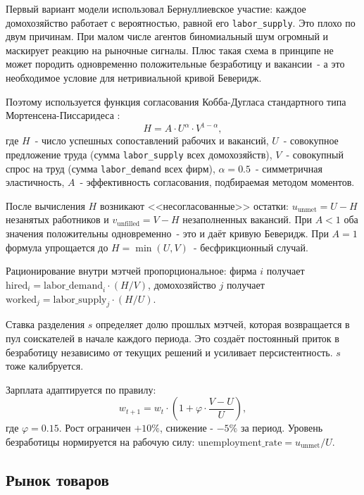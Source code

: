 \documentclass[12pt, a4paper]{article}
\begin{document}
Первый вариант модели использовал Бернуллиевское участие: каждое домохозяйство работает с вероятностью, равной его \texttt{labor\_supply}. Это плохо по двум причинам. При малом числе агентов биномиальный шум огромный и маскирует реакцию на рыночные сигналы. Плюс такая схема в принципе не может породить одновременно положительные безработицу и вакансии~- а это необходимое условие для нетривиальной кривой Беверидж.

Поэтому используется функция согласования Кобба-Дугласа стандартного типа Мортенсена-Писсаридеса \cite{mortensen1994}:
\begin{equation}
H = A \cdot U^{\alpha} \cdot V^{1-\alpha},
\end{equation}
где $H$~- число успешных сопоставлений рабочих и вакансий, $U$~- совокупное предложение труда (сумма \texttt{labor\_supply} всех домохозяйств), $V$~- совокупный спрос на труд (сумма \texttt{labor\_demand} всех фирм), $\alpha = 0.5$~- симметричная эластичность, $A$~- эффективность согласования, подбираемая методом моментов.

После вычисления $H$ возникают <<несогласованные>> остатки: $u_{\text{unmet}} = U - H$ незанятых работников и $v_{\text{unfilled}} = V - H$ незаполненных вакансий. При $A < 1$ оба значения положительны одновременно~- это и даёт кривую Беверидж. При $A = 1$ формула упрощается до $H = \min(U, V)$~- бесфрикционный случай.

Рационирование внутри мэтчей пропорциональное: фирма $i$ получает $\text{hired}_i = \text{labor\_demand}_i \cdot (H / V)$, домохозяйство $j$ получает $\text{worked}_j = \text{labor\_supply}_j \cdot (H / U)$.

Ставка разделения $s$ определяет долю прошлых мэтчей, которая возвращается в пул соискателей в начале каждого периода. Это создаёт постоянный приток в безработицу независимо от текущих решений и усиливает персистентность. $s$ тоже калибруется.

Зарплата адаптируется по правилу:
\begin{equation}
w_{t+1} = w_t \cdot \left(1 + \varphi \cdot \frac{V - U}{U}\right),
\end{equation}
где $\varphi = 0.15$. Рост ограничен $+10\%$, снижение - $-5\%$ за период. Уровень безработицы нормируется на рабочую силу: $\text{unemployment\_rate} = u_{\text{unmet}} / U$.

\subsection{Рынок товаров}
\end{document}
